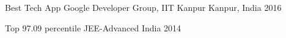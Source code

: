 
\begin{cvhonors}

  \cvhonor
    {Best Tech App} %
    {Google Developer Group, IIT Kanpur} %
    {Kanpur, India} %
    {2016} %


  \cvhonor
    {Top 97.09 percentile} %
    {JEE-Advanced} %
    {India} %
    {2014} %


\end{cvhonors}
